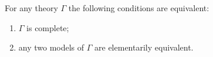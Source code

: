 For any theory $\Gamma$ the following conditions are equivalent:
\begin{enumerate}
\item[(i)] $\Gamma$ is complete;
\item[(ii)] any two models of $\Gamma$ are elementarily equivalent.
\end{enumerate}

